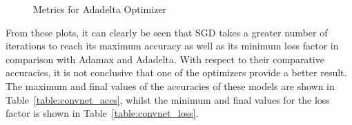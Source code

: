 \begin{figure}[!htb]
    \centering
    \begin{subfigure}[htb]{0.49\textwidth}
        \centering
    \end{subfigure}
    \hfill
    \begin{subfigure}[htb]{0.49\textwidth}
        \centering
    \end{subfigure}
    \caption{Metrics for Adadelta Optimizer}
    \label{fig:adadelta}
\end{figure}

From these plots, it can clearly be seen that SGD takes a greater number of iterations to reach its maximum accuracy as well as its minimum loss factor in comparison with Adamax and Adadelta. With respect to their comparative accuracies, it is not conclusive that one of the optimizers provide a better result. The maximum and final values of the accuracies of these models are shown in Table~\ref{table:convnet_accs}, whilst the minimum and final values for the loss factor is shown in Table~\ref{table:convnet_loss}.

